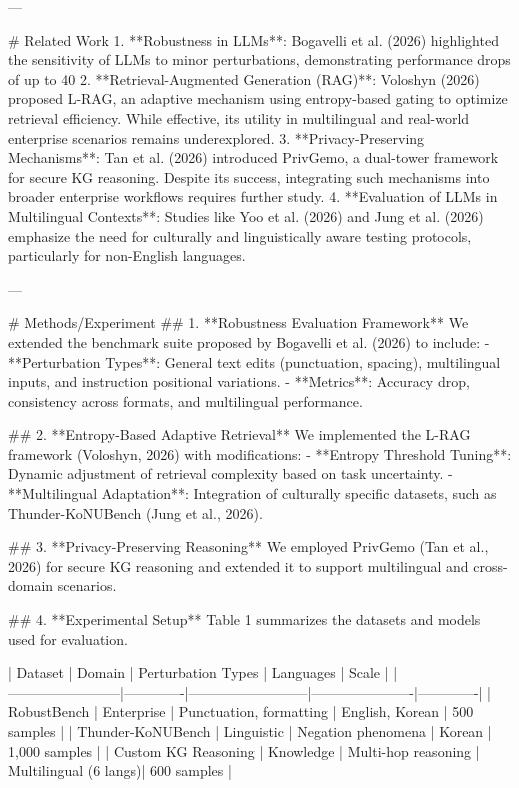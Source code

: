 ---

# Related Work  
1. **Robustness in LLMs**: Bogavelli et al. (2026) highlighted the sensitivity of LLMs to minor perturbations, demonstrating performance drops of up to 40%
2. **Retrieval-Augmented Generation (RAG)**: Voloshyn (2026) proposed L-RAG, an adaptive mechanism using entropy-based gating to optimize retrieval efficiency. While effective, its utility in multilingual and real-world enterprise scenarios remains underexplored.  
3. **Privacy-Preserving Mechanisms**: Tan et al. (2026) introduced PrivGemo, a dual-tower framework for secure KG reasoning. Despite its success, integrating such mechanisms into broader enterprise workflows requires further study.  
4. **Evaluation of LLMs in Multilingual Contexts**: Studies like Yoo et al. (2026) and Jung et al. (2026) emphasize the need for culturally and linguistically aware testing protocols, particularly for non-English languages.

---

# Methods/Experiment  
## 1. **Robustness Evaluation Framework**  
We extended the benchmark suite proposed by Bogavelli et al. (2026) to include:  
- **Perturbation Types**: General text edits (punctuation, spacing), multilingual inputs, and instruction positional variations.  
- **Metrics**: Accuracy drop, consistency across formats, and multilingual performance.

## 2. **Entropy-Based Adaptive Retrieval**  
We implemented the L-RAG framework (Voloshyn, 2026) with modifications:  
- **Entropy Threshold Tuning**: Dynamic adjustment of retrieval complexity based on task uncertainty.  
- **Multilingual Adaptation**: Integration of culturally specific datasets, such as Thunder-KoNUBench (Jung et al., 2026).  

## 3. **Privacy-Preserving Reasoning**  
We employed PrivGemo (Tan et al., 2026) for secure KG reasoning and extended it to support multilingual and cross-domain scenarios.

## 4. **Experimental Setup**  
Table 1 summarizes the datasets and models used for evaluation.  

| Dataset                | Domain      | Perturbation Types       | Languages            | Scale       |  
|------------------------|-------------|--------------------------|----------------------|-------------|  
| RobustBench            | Enterprise  | Punctuation, formatting  | English, Korean      | 500 samples |  
| Thunder-KoNUBench      | Linguistic  | Negation phenomena       | Korean               | 1,000 samples |  
| Custom KG Reasoning    | Knowledge   | Multi-hop reasoning      | Multilingual (6 langs)| 600 samples |  

